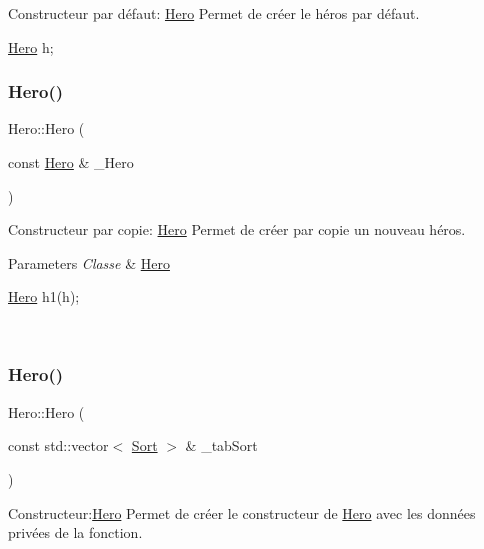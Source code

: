 Constructeur par défaut\+: \hyperlink{classHero}{Hero} Permet de créer le héros par défaut. 


\begin{DoxyCode}
\hyperlink{classHero}{Hero} h;
\end{DoxyCode}
 \mbox{\label{classHero_aaf432046f7dcf546db3e24c7976e8df7}} 
\subsubsection{\texorpdfstring{Hero()}{Hero()}\hspace{0.1cm}{\footnotesize\ttfamily [2/3]}}
{\footnotesize\ttfamily Hero\+::\+Hero (\begin{DoxyParamCaption}\item[{const \hyperlink{classHero}{Hero} \&}]{\+\_\+\+Hero }\end{DoxyParamCaption})}



Constructeur par copie\+: \hyperlink{classHero}{Hero} Permet de créer par copie un nouveau héros. 


\begin{DoxyParams}{Parameters}
{\em Classe} & \hyperlink{classHero}{Hero} 
\begin{DoxyCode}
\hyperlink{classHero}{Hero} h1(h);
\end{DoxyCode}
 \\
\hline
\end{DoxyParams}
\mbox{\label{classHero_a2fab78b80b87c8aa7a45b1ba38272795}} 
\subsubsection{\texorpdfstring{Hero()}{Hero()}\hspace{0.1cm}{\footnotesize\ttfamily [3/3]}}
{\footnotesize\ttfamily Hero\+::\+Hero (\begin{DoxyParamCaption}\item[{const std\+::vector$<$ \hyperlink{classSort}{Sort} $>$ \&}]{\+\_\+tab\+Sort }\end{DoxyParamCaption})}



Constructeur\+:\hyperlink{classHero}{Hero} Permet de créer le constructeur de \hyperlink{classHero}{Hero} avec les données privées de la fonction. 


